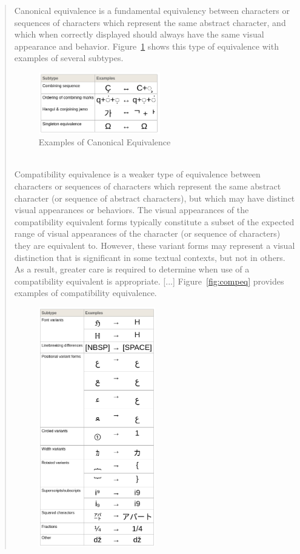 \begin{quote}
	Canonical equivalence is a fundamental equivalency between characters or sequences of characters which represent the same abstract character, and which when correctly displayed should always have the same visual appearance and behavior. Figure~\ref{fig:caneq} shows this type of equivalence with examples of several subtypes.
	\\
	\begin{figure}[h]
		\centering
		\includegraphics[width=0.52\textwidth]{caneq.png}
		\caption{Examples of Canonical Equivalence \cite{unicode/normalization}}
		\label{fig:caneq}
	\end{figure}
	\\
	Compatibility equivalence is a weaker type of equivalence between characters or sequences of characters which represent the same abstract character (or sequence of abstract characters), but which may have distinct visual appearances or behaviors. The visual appearances of the compatibility equivalent forms typically constitute a subset of the expected range of visual appearances of the character (or sequence of characters) they are equivalent to. However, these variant forms may represent a visual distinction that is significant in some textual contexts, but not in others. As a result, greater care is required to determine when use of a compatibility equivalent is appropriate. [...] Figure~\ref{fig:compeq} provides examples of compatibility equivalence. \cite{unicode/normalization}
	\begin{figure}[!h]
		\centering
		\includegraphics[width=0.5\textwidth]{compeq.png}

\end{figure}
\end{quote}
